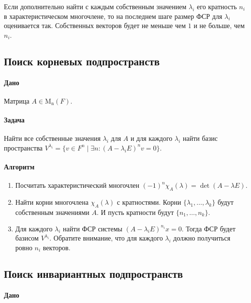 \documentclass{article}
\newcommand{\Matrix}[2]{\operatorname{\mathrm{M}_{#2}}(#1)}
\begin{document}
Если дополнительно найти с каждым собственным значением $\lambda_i$ его кратность $n_i$ в характеристическом многочлене, то на последнем шаге размер ФСР для $\lambda_i$ оценивается так.
Собственных векторов будет не меньше чем $1$ и не больше, чем $n_i$.

\subsection{Поиск корневых подпространств}

\paragraph{Дано}

Матрица $A\in\Matrix{F}{n}$.

\paragraph{Задача}

Найти все собственные значения $\lambda_i$ для $A$ и для каждого $\lambda_i$ найти базис пространства $V^{\lambda_i} = \{v\in F^{n}\mid \exists n\colon (A - \lambda_i E)^n v = 0\}$.

\paragraph{Алгоритм}

\begin{enumerate}
\item Посчитать характеристический многочлен $(-1)^n\chi_A(\lambda) = \det(A-\lambda E)$.

\item Найти корни многочлена $\chi_A(\lambda)$ с кратностями.
Корни $\{\lambda_1,\ldots,\lambda_k\}$ будут собственным значениями $A$.
И пусть кратности будут $\{n_1,\ldots, n_k\}$.

\item Для каждого $\lambda_i$ найти ФСР системы $(A-\lambda_i E)^{n_i}x = 0$.
Тогда ФСР будет базисом $V^{\lambda_i}$.
Обратите внимание, что для каждого $\lambda_i$ должно получиться ровно $n_i$ векторов.
\end{enumerate}

\subsection{Поиск инвариантных подпространств}

\paragraph{Дано}
\end{document}
